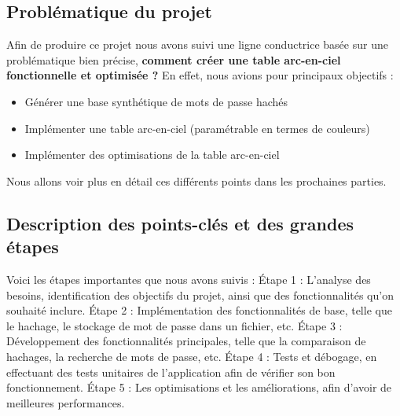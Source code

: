 \documentclass[a4paper,12pt]{article}
\begin{document}
\subsection{Problématique du projet}
Afin de produire ce projet nous avons suivi une ligne conductrice basée sur une problématique bien précise, \textbf{comment créer une table arc-en-ciel fonctionnelle et optimisée ?} En effet, nous avions pour principaux objectifs :
\begin{itemize}
    \item Générer une base synthétique de mots de passe hachés
    \item Implémenter une table arc-en-ciel (paramétrable en termes de couleurs)
    \item Implémenter des optimisations de la table arc-en-ciel
\end{itemize}
Nous allons voir plus en détail ces différents points dans les prochaines parties.

\subsection{Description des points-clés et des grandes étapes}
Voici les étapes importantes que nous avons suivis :\newline
Étape 1 : L'analyse des besoins, identification des objectifs du projet, ainsi que des fonctionnalités qu'on souhaité inclure.\newline
Étape 2 : Implémentation des fonctionnalités de base, telle que le hachage, le stockage de mot de passe dans un fichier, etc.\newline
Étape 3 : Développement des fonctionnalités principales, telle que la comparaison de hachages, la recherche de mots de passe, etc.\newline
Étape 4 : Tests et débogage, en effectuant des tests unitaires de l'application afin de vérifier son bon fonctionnement.\newline
Étape 5 : Les optimisations et les améliorations, afin d'avoir de meilleures performances.\newline 
\end{document}
